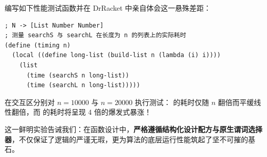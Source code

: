 编写如下性能测试函数并在 DrRacket 中亲自体会这一悬殊差距：
\begin{lstlisting}[language=BSL]
; N -> [List Number Number]
; 测量 searchS 与 searchL 在长度为 n 的列表上的实际耗时
(define (timing n)
  (local ((define long-list (build-list n (lambda (i) i))))
    (list
      (time (searchS n long-list))
      (time (searchL n long-list)))))
\end{lstlisting}

在交互区分别对 $n = 10000$ 与 $n = 20000$ 执行测试： 的耗时仅随 $n$ 翻倍而平缓线性翻倍，而  的耗时将呈现 4 倍的爆发式暴涨！

这一鲜明实验告诫我们：在函数设计中，\textbf{严格遵循结构化设计配方与原生谓词选择器}，不仅保证了逻辑的严谨无瑕，更为算法的底层运行性能筑起了坚不可摧的基石。
